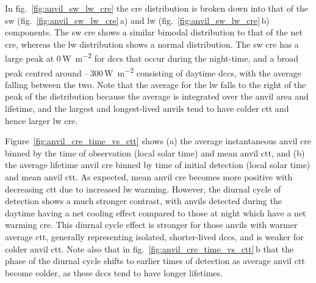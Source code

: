 In fig.~\ref{fig:anvil_sw_lw_cre} the \acrshort{cre} distribution is broken down into that of the \acrshort{sw} (fig.~\ref{fig:anvil_sw_lw_cre}\,a) and \acrshort{lw} (fig.~\ref{fig:anvil_sw_lw_cre}\,b) components. 
The \acrshort{sw} \acrshort{cre} shows a similar bimodal distribution to that of the net \acrshort{cre}, whereas the \acrshort{lw} distribution shows a normal distribution. 
The \acrshort{sw} \acrshort{cre} has a large peak at 0\,\unit{W m^{-2}} for \acrshort{dcc}s that occur during the night-time, and a broad peak centred around --\,300\,\unit{W m^{-2}} consisting of daytime \acrshort{dcc}s, with the average falling between the two. 
Note that the average for the \acrshort{lw} falls to the right of the peak of the distribution because the average is integrated over the anvil area and lifetime, and the largest and longest-lived anvils tend to have colder \acrshort{ctt} and hence larger \acrshort{lw} \acrshort{cre}.

Figure~\ref{fig:anvil_cre_time_vs_ctt} shows (a) the average instantaneous anvil \acrshort{cre} binned by the time of observation (local solar time) and mean anvil \acrshort{ctt}, and (b) the average lifetime anvil \acrshort{cre} binned by time of initial detection (local solar time) and mean anvil \acrshort{ctt}.
As expected, mean anvil \acrshort{cre} becomes more positive with decreasing \acrshort{ctt} due to increased \acrshort{lw} warming. 
However, the diurnal cycle of detection shows a much stronger contrast, with anvils detected during the daytime having a net cooling effect compared to those at night which have a net warming \acrshort{cre}. 
This diurnal cycle effect is stronger for those anvils with warmer average \acrshort{ctt}, generally representing isolated, shorter-lived \acrshort{dcc}s, and is weaker for colder anvil \acrshort{ctt}. 
Note also that in fig.~\ref{fig:anvil_cre_time_vs_ctt}\,b that the phase of the diurnal cycle shifts to earlier times of detection as average anvil \acrshort{ctt} become colder, as these \acrshort{dcc}s tend to have longer lifetimes.


